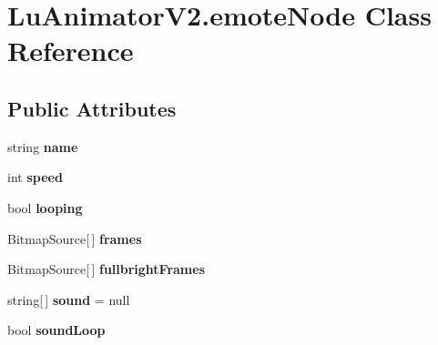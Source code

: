 \hypertarget{class_lu_animator_v2_1_1emote_node}{}\section{Lu\+Animator\+V2.\+emote\+Node Class Reference}
\label{class_lu_animator_v2_1_1emote_node}
\subsection*{Public Attributes}
\begin{DoxyCompactItemize}
\item 
string {\bfseries name}\hypertarget{class_lu_animator_v2_1_1emote_node_a731deded5be04d85bf0f186e7b07c34e}{}\label{class_lu_animator_v2_1_1emote_node_a731deded5be04d85bf0f186e7b07c34e}

\item 
int {\bfseries speed}\hypertarget{class_lu_animator_v2_1_1emote_node_ac766a2bfc7c4d1afa86bcdf53c35895b}{}\label{class_lu_animator_v2_1_1emote_node_ac766a2bfc7c4d1afa86bcdf53c35895b}

\item 
bool {\bfseries looping}\hypertarget{class_lu_animator_v2_1_1emote_node_a75774a71bedb73f8aa9066e590ec541a}{}\label{class_lu_animator_v2_1_1emote_node_a75774a71bedb73f8aa9066e590ec541a}

\item 
Bitmap\+Source\mbox{[}$\,$\mbox{]} {\bfseries frames}\hypertarget{class_lu_animator_v2_1_1emote_node_ae39e90d5edf3da2ed5b5a1729cae3435}{}\label{class_lu_animator_v2_1_1emote_node_ae39e90d5edf3da2ed5b5a1729cae3435}

\item 
Bitmap\+Source\mbox{[}$\,$\mbox{]} {\bfseries fullbright\+Frames}\hypertarget{class_lu_animator_v2_1_1emote_node_ad43278045af59da24d62bdb1c5b034bf}{}\label{class_lu_animator_v2_1_1emote_node_ad43278045af59da24d62bdb1c5b034bf}

\item 
string\mbox{[}$\,$\mbox{]} {\bfseries sound} = null\hypertarget{class_lu_animator_v2_1_1emote_node_afa10dfc82a4d37acb974f1819d4bc7a8}{}\label{class_lu_animator_v2_1_1emote_node_afa10dfc82a4d37acb974f1819d4bc7a8}

\item 
bool {\bfseries sound\+Loop}\hypertarget{class_lu_animator_v2_1_1emote_node_a2eccbac74421c46877f1e72797f838a4}{}\label{class_lu_animator_v2_1_1emote_node_a2eccbac74421c46877f1e72797f838a4}


\end{DoxyCompactItemize}
